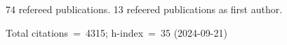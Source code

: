 74 refereed publications. 13 refeered publications as first author.

Total citations~=~4315; h-index~=~35 (2024-09-21)